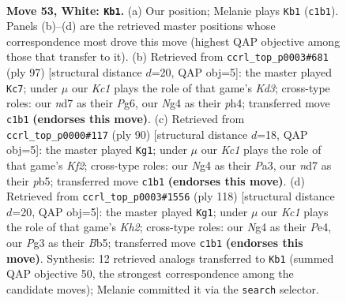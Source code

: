 \documentclass[11pt]{article}
\begin{document}
\clearpage

\begin{figure}[p]\centering
\begin{subfigure}{0.46\textwidth}\centering
\resizebox{\linewidth}{!}{%
\newchessgame
\chessboard[
  setfen={8/kb1n4/8/8/p2p2N1/P5P1/1PP5/2K5 w - - 24 53},
  showmover=false,
  pgfstyle=straightmove, color=movearrow, markmove={c1-b1}
]}
\caption{}
\end{subfigure}\hfill
\begin{subfigure}{0.46\textwidth}\centering
\resizebox{\linewidth}{!}{%
\newchessgame
\chessboard[
  setfen={8/8/3k2p1/2p1pp2/P6P/3P2P1/4K3/8 b - - 0 49},
  showmover=false,
  pgfstyle=straightmove, color=movearrow, markmove={d6-c7}
]}
\caption{}
\end{subfigure}
\\[4pt]
\begin{subfigure}{0.46\textwidth}\centering
\resizebox{\linewidth}{!}{%
\newchessgame
\chessboard[
  setfen={8/p7/4k3/1p3p1p/1P5P/P3P1P1/5K2/8 w - - 8 46},
  showmover=false,
  pgfstyle=straightmove, color=movearrow, markmove={f2-g1}
]}
\caption{}
\end{subfigure}\hfill
\begin{subfigure}{0.46\textwidth}\centering
\resizebox{\linewidth}{!}{%
\newchessgame
\chessboard[
  setfen={8/4b3/4P2k/1B2p2p/4Pp2/5P2/6PK/8 w - - 1 60},
  showmover=false,
  pgfstyle=straightmove, color=movearrow, markmove={h2-g1}
]}
\caption{}
\end{subfigure}
\caption{\textbf{Move 53, White: \texttt{Kb1}.} (a) Our position; Melanie plays \texttt{Kb1} (\texttt{c1b1}). Panels (b)--(d) are the retrieved master positions whose correspondence most drove this move (highest QAP objective among those that transfer to it). (b) Retrieved from \texttt{ccrl\_top\_p0003\#681} (ply 97) [structural distance $d$=20, QAP obj=5]: the master played \texttt{Kc7}; under $\mu$ our \emph{Kc1} plays the role of that game's \emph{Kd3}; cross-type roles: our \emph{n}d7 as their \emph{P}g6, our \emph{N}g4 as their \emph{p}h4; transferred move \texttt{c1b1} \textbf{(endorses this move)}. (c) Retrieved from \texttt{ccrl\_top\_p0000\#117} (ply 90) [structural distance $d$=18, QAP obj=5]: the master played \texttt{Kg1}; under $\mu$ our \emph{Kc1} plays the role of that game's \emph{Kf2}; cross-type roles: our \emph{N}g4 as their \emph{P}a3, our \emph{n}d7 as their \emph{p}b5; transferred move \texttt{c1b1} \textbf{(endorses this move)}. (d) Retrieved from \texttt{ccrl\_top\_p0003\#1556} (ply 118) [structural distance $d$=20, QAP obj=5]: the master played \texttt{Kg1}; under $\mu$ our \emph{Kc1} plays the role of that game's \emph{Kh2}; cross-type roles: our \emph{N}g4 as their \emph{P}e4, our \emph{P}g3 as their \emph{B}b5; transferred move \texttt{c1b1} \textbf{(endorses this move)}. Synthesis: 12 retrieved analogs transferred to \texttt{Kb1} (summed QAP objective 50, the strongest correspondence among the candidate moves); Melanie committed it via the \texttt{search} selector.}
\label{fig:thought-m104}
\end{figure}
\end{document}
